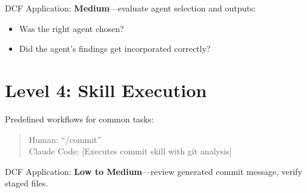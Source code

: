 DCF Application: \textbf{Medium}---evaluate agent selection and outputs:
\begin{itemize}
    \item Was the right agent chosen?
    \item Did the agent's findings get incorporated correctly?
\end{itemize}

\section{Level 4: Skill Execution}

Predefined workflows for common tasks:

\begin{quote}
Human: ``/commit'' \\
Claude Code: [Executes commit skill with git analysis]
\end{quote}

DCF Application: \textbf{Low to Medium}---review generated commit message, verify staged files.

